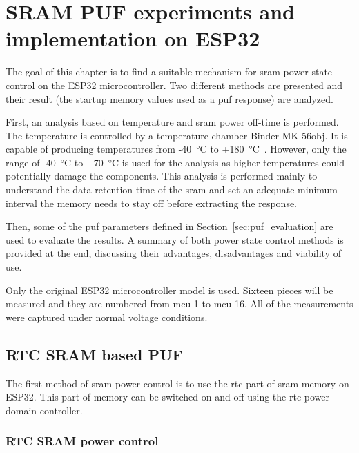 \chapter{SRAM PUF experiments and implementation on ESP32}\label{sec:implementation}


The goal of this chapter is to find a suitable mechanism for \gls{sram} power state control on the ESP32 microcontroller. Two different methods are presented and their result (the startup memory values used as a \gls{puf} response) are analyzed. 

First, an analysis based on temperature and \gls{sram} power off-time is performed. The temperature is controlled by a temperature chamber Binder MK-56obj. It is capable of producing temperatures from -40~°C to +180~°C~\cite{Binder2021}. However, only the range of -40~°C to +70~°C is used for the analysis as higher temperatures could potentially damage the components. This analysis is performed mainly to understand the data retention time of the \gls{sram} and set an adequate minimum interval the memory needs to stay off before extracting the response.

Then, some of the \gls{puf} parameters defined in Section~\ref{sec:puf_evaluation} are used to evaluate the results. A summary of both power state control methods is provided at the end, discussing their advantages, disadvantages and viability of use.

Only the original ESP32 microcontroller model is used. Sixteen pieces will be measured and they are numbered from \gls{mcu} 1 to \gls{mcu} 16. All of the measurements were captured under normal voltage conditions. 

\section{RTC SRAM based PUF}

The first method of \gls{sram} power control is to use the \gls{rtc} part of \gls{sram} memory on ESP32. This part of memory can be switched on and off using the \gls{rtc} power domain controller.
 
\subsection{RTC SRAM power control}

